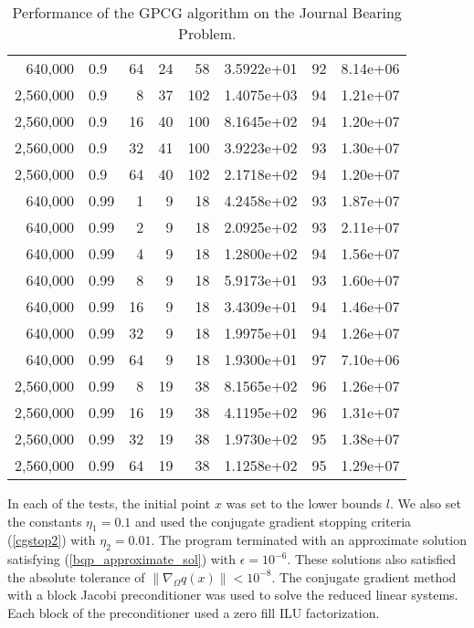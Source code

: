 \begin{table}[htbp]
\begin{center}
\begin{tabular}{|rlr|rrccc|}
640,000 & 0.9 & 64 & 24 & 58 & 3.5922e+01 & 92 & 8.14e+06 \\
2,560,000  & 0.9 & 8 & 37 & 102 & 1.4075e+03 & 94 & 1.21e+07  \\
2,560,000  & 0.9 & 16 & 40 & 100 & 8.1645e+02 & 94 & 1.20e+07 \\
2,560,000  & 0.9 & 32 & 41 & 100 & 3.9223e+02 & 93 &  1.30e+07 \\
2,560,000  & 0.9 & 64 & 40 & 102 & 2.1718e+02 & 94 & 1.20e+07   \\
\hline
640,000 & 0.99 & 1 &  9 & 18 & 4.2458e+02  & 93 & 1.87e+07 \\
640,000 & 0.99 & 2 &  9 & 18 & 2.0925e+02 & 93 & 2.11e+07 \\
640,000 & 0.99 & 4 &  9 & 18 & 1.2800e+02  & 94 & 1.56e+07 \\
640,000 & 0.99 & 8 &  9 & 18 & 5.9173e+01 & 93 & 1.60e+07 \\
640,000 & 0.99 & 16 & 9 & 18 & 3.4309e+01  & 94 & 1.46e+07 \\
640,000 & 0.99 & 32 & 9 & 18 & 1.9975e+01  & 94 & 1.26e+07 \\
640,000 & 0.99 & 64 & 9 & 18 & 1.9300e+01 & 97 & 7.10e+06 \\
2,560,000  & 0.99 & 8 & 19 & 38 & 8.1565e+02 & 96 & 1.26e+07 \\
2,560,000  & 0.99 & 16 & 19 & 38 & 4.1195e+02  & 96 & 1.31e+07 \\
2,560,000  & 0.99 & 32 & 19 & 38 & 1.9730e+02 & 95 & 1.38e+07 \\
2,560,000  & 0.99 & 64 & 19 & 38 & 1.1258e+02 &95 & 1.29e+07   \\
\hline
\end{tabular}
\caption{Performance of the  GPCG algorithm on the Journal Bearing Problem.}
\label{flops}
\end{center}
\end{table}

In each of the tests, the initial point $x$ was set to the
lower bounds $l$.  We also set the constants $\eta_1  = 0.1$ and
used the conjugate gradient stopping criteria
(\ref{cgstop2}) with $\eta_2=0.01$.  The program terminated with
an approximate solution satisfying (\ref{bqp_approximate_sol})
with $\epsilon=10^{-6}$.  These
solutions also satisfied the absolute tolerance of
$\| \nabla_{\Omega} q(x) \| < 10^{-8} $.
The conjugate gradient method with a block Jacobi preconditioner was
used to solve the reduced linear systems.
Each block of the preconditioner used a zero fill ILU factorization.

